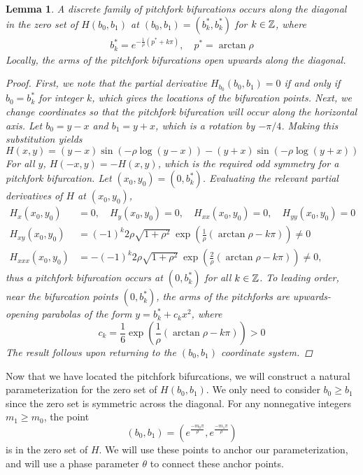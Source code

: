 \documentclass[10pt,reqno]{amsart}
\theoremstyle{plain}
\newtheorem{lemma}[theorem]{Lemma}
\theoremstyle{definition}
\theoremstyle{remark}
\numberwithin{theorem}{section}
\numberwithin{equation}{section}
\begin{document}
\begin{lemma}\label{pitchforkH}
A discrete family of pitchfork bifurcations occurs along the diagonal in the zero set of $H(b_0, b_1)$ at $(b_0, b_1) = (b_k^*, b_k^*)$ for $k \in \mathbb{Z}$, where
\begin{align}\label{pkstar}
b^*_k = e^{-\frac{1}{\rho} (p^* + k \pi) }, \quad p^* = \arctan \rho 
\end{align}
Locally, the arms of the pitchfork bifurcations open upwards along the diagonal.
\begin{proof}
First, we note that the partial derivative $H_{b_0}(b_0, b_1) = 0$ if and only if $b_0 = b_k^*$ for integer $k$, which gives the locations of the bifurcation points. Next, we change coordinates so that the pitchfork bifurcation will occur along the horizontal axis. Let $b_0 = y-x$ and $b_1 = y+x$, which is a rotation by $-\pi/4$. Making this substitution yields
\begin{equation}\label{Hxy}
H(x, y) = 
(y - x) \sin \left( -\rho \log(y - x) \right) - (y + x) \sin \left( - \rho \log (y + x) \right)
\end{equation}
For all $y$, $H(-x, y) = -H(x, y)$, which is the required odd symmetry for a pitchfork bifurcation. Let $(x_0, y_0) = \left(0, b^*_k \right)$. Evaluating the relevant partial derivatives of $H$ at $(x_0, y_0)$,
\begin{align*}
H_x(x_0, y_0) &= 0, \quad H_y(x_0, y_0) = 0, \quad H_{xx}(x_0, y_0) = 0, \quad H_{yy}(x_0, y_0) = 0 \\
H_{xy}(x_0, y_0) &= (-1)^k 2 \rho \sqrt{1 + \rho^2} \: \exp{\left(\frac{1}{\rho} (\arctan \rho - k \pi) \right)} \neq 0 \\
H_{xxx}(x_0, y_0)
&= -(-1)^k 2 \rho \sqrt{1 + \rho^2} \: \exp{\left(\frac{2}{\rho} (\arctan \rho - k \pi) \right)} \neq 0,
\end{align*}
thus a pitchfork bifurcation occurs at $(0, b^*_k)$ for all $k \in \mathbb{Z}$. To leading order, near the bifurcation points $(0, b_k^*)$, the arms of the pitchforks are upwards-opening parabolas of the form $y = b_k^* + c_k x^2$, where
\begin{equation*}
c_k = \frac{1}{6}\exp{\left(\frac{1}{\rho} (\arctan \rho - k \pi) \right)} > 0
\end{equation*}
The result follows upon returning to the $(b_0, b_1)$ coordinate system.
\end{proof}
\end{lemma}

Now that we have located the pitchfork bifurcations, we will construct a natural parameterization for the zero set of $H(b_0, b_1)$. We only need to consider $b_0 \geq b_1$ since the zero set is symmetric across the diagonal. For any nonnegative integers $m_1 \geq m_0$, the point
\[
(b_0, b_1) = \left( e^{\frac{-m_0 \pi}{\rho}}, e^{\frac{-m_1 \pi}{\rho}}\right)
\]
is in the zero set of $H$. We will use these points to anchor our parameterization, and will use a phase parameter $\theta$ to connect these anchor points. 
\end{document}
